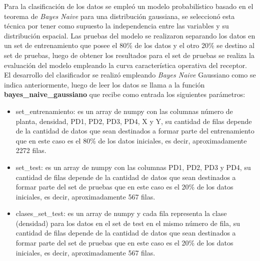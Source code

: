 Para la clasificación de los datos se empleó un modelo probabilístico basado en el teorema de \textit{Bayes Naive}  para una distribución
gaussiana, se seleccionó esta técnica por tener como supuesto la independencia entre las variables y su distribución
espacial. Las pruebas del modelo se realizaron separando los datos en un set de entrenamiento que posee el 80\% de los
datos y el otro 20\% se destino al set de pruebas, luego de obtener los resultados para el set de pruebas se realiza la
evaluación del modelo empleando la curva característica operativa del receptor.\\

El desarrollo del clasificador se realizó empleando \textit{Bayes Naive} Gaussiano como se indica anteriormente, luego de leer los datos se llama a la función
\textbf{bayes\_naive\_gaussiano} que recibe como entrada los siguientes parámetros:
\begin{itemize}
	\item{set\_entrenamiento: es un array de numpy con las columnas número de planta, densidad, PD1, PD2, PD3, PD4, X y Y, su
	cantidad de filas depende de la cantidad de datos que sean destinados a formar parte del entrenamiento que en este caso es
	el 80\% de los datos iniciales, es decir, aproximadamente 2272 filas.}
	\item{set\_test: es un array de numpy con las columnas PD1, PD2, PD3 y PD4, su cantidad de filas depende de la cantidad de
	datos que sean destinados a formar parte del set de pruebas que en este caso es el 20\% de los datos iniciales, es decir,
	aproximadamente 567 filas.}
	\item{clases\_set\_test: es un array de numpy y cada fila representa la clase (densidad) para los datos en el set de test
	en el mismo número de fila, su cantidad de filas depende de la cantidad de datos que sean destinados a formar parte del set
	de pruebas que en este caso es el 20\% de los datos iniciales, es decir, aproximadamente 567 filas.\\}
\end{itemize}

